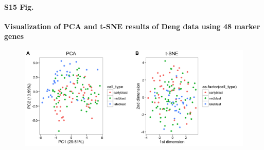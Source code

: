 \documentclass[10pt,letterpaper]{article}
\begin{document}
\paragraph*{S15 Fig.}

\label{figS15}
{\bf Visualization of PCA and t-SNE results of Deng data using 48 marker genes}
\begin{figure}[ht]
\centering
\includegraphics[height=2in, width=6in]{../../src/figure/deng-digging-final.Rmd/combined-visualization-1.png}
\end{figure}
\end{document}
